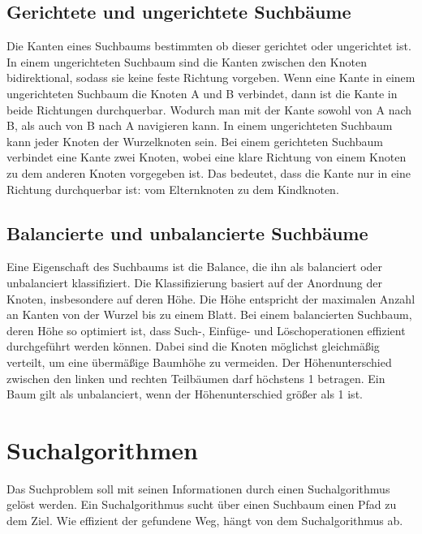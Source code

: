 \subsection{Gerichtete und ungerichtete Suchb\"{a}ume} \label{gerichtete Graphen}
\label{chap:gerichtet und ungerichtete suchb\"{a}ume}

Die Kanten eines Suchbaums bestimmten ob dieser gerichtet oder ungerichtet ist. In einem ungerichteten Suchbaum sind die Kanten zwischen den Knoten bidirektional, sodass sie keine feste Richtung vorgeben. Wenn eine Kante in einem ungerichteten Suchbaum die Knoten A und B verbindet, dann ist die Kante in beide Richtungen durchquerbar. Wodurch man mit der Kante sowohl von A nach B, als auch von B nach A navigieren kann. In einem ungerichteten Suchbaum kann jeder Knoten der Wurzelknoten sein. Bei einem gerichteten Suchbaum verbindet eine Kante zwei Knoten, wobei eine klare Richtung von einem Knoten zu dem anderen Knoten vorgegeben ist. Das bedeutet, dass die Kante nur in eine Richtung durchquerbar ist: vom Elternknoten zu dem Kindknoten.

\subsection{Balancierte und unbalancierte Suchb\"{a}ume}
\label{chap:balancierte und unbalancierte suchb\"{a}ume}

Eine Eigenschaft des Suchbaums ist die Balance, die ihn als balanciert oder unbalanciert klassifiziert. Die Klassifizierung basiert auf der Anordnung der Knoten, insbesondere auf deren H\"{o}he. Die H\"{o}he entspricht der maximalen Anzahl an Kanten von der Wurzel bis zu einem Blatt. Bei einem balancierten Suchbaum, deren H\"{o}he so optimiert ist, dass Such-, Einf\"{u}ge- und L\"{o}schoperationen effizient durchgef\"{u}hrt werden k\"{o}nnen. Dabei sind die Knoten m\"{o}glichst gleichm\"{a}\ss{}ig verteilt, um eine \"{u}berm\"{a}\ss{}ige Baumh\"{o}he zu vermeiden. Der H\"{o}henunterschied zwischen den linken und rechten Teilb\"{a}umen darf h\"{o}chstens 1 betragen. Ein Baum gilt als unbalanciert, wenn der H\"{o}henunterschied gr\"{o}\ss{}er als 1 ist.

\section{Suchalgorithmen}
\label{chap:suchalgorithmen}

Das Suchproblem soll mit seinen Informationen durch einen Suchalgorithmus gel\"{o}st werden. Ein Suchalgorithmus sucht \"{u}ber einen Suchbaum einen Pfad zu dem Ziel. Wie effizient der gefundene Weg, h\"{a}ngt von dem Suchalgorithmus ab. 

